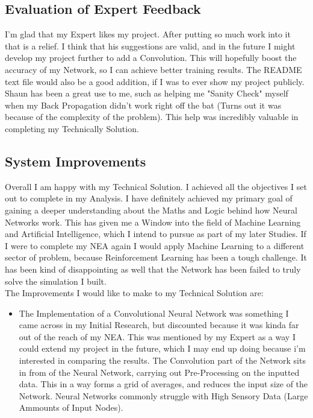 \begin{flushleft}
    \subsection{Evaluation of Expert Feedback}
        \vspace{0.2cm}
        I'm glad that my Expert likes my project. After putting so much work into it that is a relief. I think that his suggestions are valid, and
        in the future I might develop my project further to add a Convolution. This will hopefully boost the accuracy of my Network, so I can achieve
        better training results. The README text file would also be a good addition, if I was to ever show my project publicly. \\
        \vspace{0.2cm}
        Shaun has been a great use to me, such as helping me "Sanity Check" myself when my Back Propagation didn't work right off the bat (Turns out
        it was because of the complexity of the problem). This help was incredibly valuable in completing my Technically Solution. \\
        \vspace{0.5cm}
    \subsection{System Improvements}
        \vspace{0.2cm}
        Overall I am happy with my Technical Solution. I achieved all the objectives I set out to complete in my Analysis. I have definitely achieved
        my primary goal of gaining a deeper understanding about the Maths and Logic behind how Neural Networks work. This has given me a Window into
        the field of Machine Learning and Artificial Intelligence, which I intend to pursue as part of my later Studies. If I were to complete my NEA
        again I would apply Machine Learning to a different sector of problem, because Reinforcement Learning has been a tough challenge. It has been
        kind of disappointing as well that the Network has been failed to truly solve the simulation I built. \\
        \vspace{0.2cm}
        The Improvements I would like to make to my Technical Solution are: \\
        \vspace{0.5cm}

        \begin{itemize}
            \item The Implementation of a Convolutional Neural Network was something I came across in my Initial Research, but discounted because it was
            kinda far out of the reach of my NEA. This was mentioned by my Expert as a way I could extend my project in the future, which I may end up
            doing because i'm interested in comparing the results. The Convolution part of the Network sits in from of the Neural Network, carrying out 
            Pre-Processing on the inputted data. This in a way forms a grid of averages, and reduces the input size of the Network. Neural Networks
            commonly struggle with High Sensory Data (Large Ammounts of Input Nodes).


\end{itemize}
\end{flushleft}

